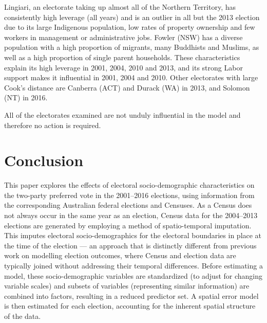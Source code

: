 \documentclass[times, doublespace]{anzsauth}
\begin{document}
Lingiari, an electorate taking up almost all of the Northern Territory, has consistently high leverage (all years) and is an outlier in all but the 2013 election due to its large Indigenous population, low rates of property ownership and few workers in management or administrative jobs. Fowler (NSW) has a diverse population with a high proportion of migrants, many Buddhists and Muslims, as well as a high proportion of single parent households. These characteristics explain its high leverage in 2001, 2004, 2010 and 2013, and its strong Labor support makes it influential in 2001, 2004 and 2010. Other electorates with large Cook's distance are Canberra (ACT) and Durack (WA) in 2013, and Solomon (NT) in 2016.

All of the electorates examined are not unduly influential in the model and therefore no action is required.

\hypertarget{conclusion}{%
\section{Conclusion}\label{conclusion}}

This paper explores the effects of electoral socio-demographic characteristics on the two-party preferred vote in the 2001--2016 elections, using information from the corresponding Australian federal elections and Censuses. As a Census does not always occur in the same year as an election, Census data for the 2004--2013 elections are generated by employing a method of spatio-temporal imputation. This imputes electoral socio-demographics for the electoral boundaries in place at the time of the election --- an approach that is distinctly different from previous work on modelling election outcomes, where Census and election data are typically joined without addressing their temporal differences. Before estimating a model, these socio-demographic variables are standardized (to adjust for changing variable scales) and subsets of variables (representing similar information) are combined into factors, resulting in a reduced predictor set. A spatial error model is then estimated for each election, accounting for the inherent spatial structure of the data.
\end{document}
